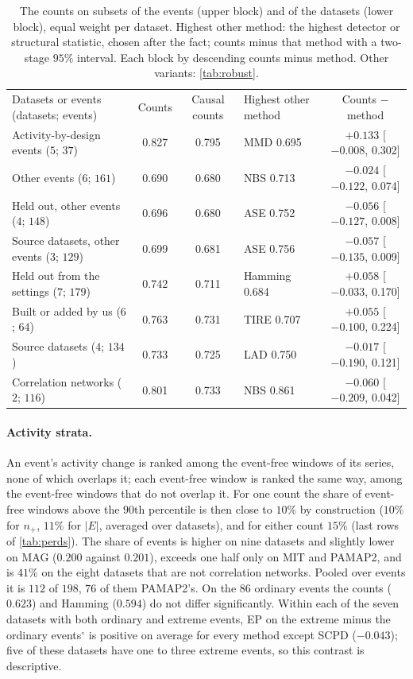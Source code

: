 \documentclass[11pt]{article}
\let\dsmidrule\midrule
\renewcommand{\midrule}{\arrayrulecolor{dsrule}\dsmidrule\arrayrulecolor{dsnavy}}
\theoremstyle{dsplain}
\theoremstyle{definition}
\begin{document}
\begin{table}[!htb]
  \centering
  \caption{The counts on subsets of the events (upper block) and of the datasets (lower block),
  equal weight per dataset. Highest other method: the highest detector or structural statistic, chosen
  after the fact; counts minus that method with a two-stage $95\%$ interval. Each block by descending
  counts minus method. Other variants: \cref{tab:robust}.}
  \label{tab:pools}
  \footnotesize
  \setlength{\tabcolsep}{4pt}
  \begin{tabular}{lcclc}
    \toprule
    Datasets or events (datasets; events) & Counts & Causal counts & Highest other method & Counts $-$ method \\
    \midrule
    Activity-by-design events ($5$; $37$) & 0.827 & 0.795 & MMD 0.695 & $+0.133$ [$-0.008$, 0.302] \\
    Other events ($6$; $161$) & 0.690 & 0.680 & NBS 0.713 & $-0.024$ [$-0.122$, 0.074] \\
    Held out, other events ($4$; $148$) & 0.696 & 0.680 & ASE 0.752 & $-0.056$ [$-0.127$, 0.008] \\
    Source datasets, other events ($3$; $129$) & 0.699 & 0.681 & ASE 0.756 & $-0.057$ [$-0.135$, 0.009] \\
    \midrule
    Held out from the settings ($7$; $179$) & 0.742 & 0.711 & Hamming 0.684 & $+0.058$ [$-0.033$, 0.170] \\
    Built or added by us ($6$; $64$) & 0.763 & 0.731 & TIRE 0.707 & $+0.055$ [$-0.100$, 0.224] \\
    Source datasets ($4$; $134$) & 0.733 & 0.725 & LAD 0.750 & $-0.017$ [$-0.190$, 0.121] \\
    Correlation networks ($2$; $116$) & 0.801 & 0.733 & NBS 0.861 & $-0.060$ [$-0.209$, 0.042] \\
    \bottomrule
  \end{tabular}
\end{table}

\paragraph{Activity strata.} An event's activity change is ranked among the event-free windows of its
series, none of which overlaps it; each event-free window is ranked the same way, among the event-free
windows that do not overlap it. For one count the share of event-free windows above the $90$th percentile is
then close to $10\%$ by construction ($10\%$ for $n_+$, $11\%$ for $|E|$, averaged over datasets), and for
either count $15\%$ (last rows of \cref{tab:perds}). The share of events is higher on nine datasets and
slightly lower on MAG ($0.200$ against $0.201$), exceeds one half only on MIT and PAMAP2, and is $41\%$ on the eight datasets that are not
correlation networks. Pooled over events it is $112$ of $198$, $76$ of them PAMAP2's. On the $86$ ordinary
events the counts ($0.623$) and Hamming ($0.594$) do not differ significantly. Within each of the seven
datasets with both ordinary and extreme events, EP on the extreme minus the ordinary events$^\circ$ is
positive on average for every method except SCPD ($-0.043$); five of these datasets have one to three
extreme events, so this contrast is descriptive.
\end{document}
